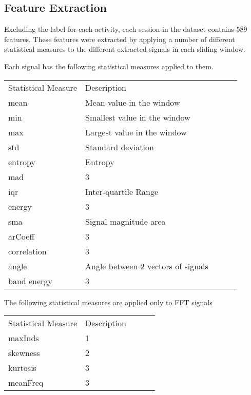 \subsection{Feature Extraction}
    Excluding the label for each activity, each session in the dataset contains 589 features. These features were extracted by applying a number of different statistical
    measures to the different extracted signals in each sliding window.

    Each signal has the following statistical measures applied to them.

    \begin{table}[]
    \begin{tabular}{|l|l|lll}
    \cline{1-2}
    Statistical Measure & Description &  &  &  \\ \cline{1-2}
    mean             & Mean value in the window           &  &  &  \\ \cline{1-2}
    min            & Smallest value in the window           &  &  &  \\ \cline{1-2}
    max            & Largest value in the window           &  &  & \\ \cline{1-2}
    std            & Standard deviation           &  &  & \\ \cline{1-2}
    entropy            & Entropy           &  &  & \\ \cline{1-2}
    mad            & 3           &  &  & \\ \cline{1-2}
    iqr            & Inter-quartile Range           &  &  & \\ \cline{1-2}
    energy            & 3           &  &  & \\ \cline{1-2}
    sma            & Signal magnitude area           &  &  & \\ \cline{1-2}
    arCoeff            & 3           &  &  & \\ \cline{1-2}
    correlation            & 3           &  &  & \\ \cline{1-2}
    angle            & Angle between 2 vectors of signals           &  &  & \\ \cline{1-2}
    band energy            & 3           &  &  & \\ \cline{1-2}
    \end{tabular}
    \end{table}

    The following statistical measures are applied only to FFT signals

    \begin{table}[]
    \begin{tabular}{|l|l|lll}
    \cline{1-2}
    Statistical Measure & Description &  &  &  \\ \cline{1-2}
    maxInds             & 1           &  &  &  \\ \cline{1-2}
    skewness            & 2           &  &  &  \\ \cline{1-2}
    kurtosis               & 3           &  &  &  \\ \cline{1-2}
    meanFreq            & 3           &  &  &  \\ \cline{1-2}
    \end{tabular}
    \end{table}


